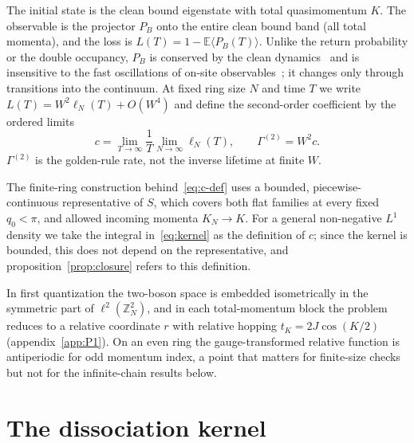 \documentclass[12pt,a4paper]{article}
\theoremstyle{remark}
\newcommand{\E}{\mathbb{E}}
\begin{document}
The initial state is the clean bound eigenstate with total quasimomentum $K$. The observable is the projector $P_B$ onto the entire clean bound band (all total momenta), and the loss is $L(T)=1-\E\langle P_B(T)\rangle$. Unlike the return probability or the double occupancy, $P_B$ is conserved by the clean dynamics~\cite{Boschi2014} and is insensitive to the fast oscillations of on-site observables~\cite{Bello2017}; it changes only through transitions into the continuum. At fixed ring size $N$ and time $T$ we write $L(T)=W^2\ell_N(T)+O(W^4)$ and define the second-order coefficient by the ordered limits
\begin{equation}\label{eq:c-def}
c=\lim_{T\to\infty}\frac{1}{T}\lim_{N\to\infty}\ell_N(T),\qquad \Gamma^{(2)}=W^2c .
\end{equation}
$\Gamma^{(2)}$ is the golden-rule rate, not the inverse lifetime at finite $W$.

The finite-ring construction behind~\eqref{eq:c-def} uses a bounded, piecewise-continuous representative of $S$, which covers both flat families at every fixed $q_0<\pi$, and allowed incoming momenta $K_N\to K$. For a general non-negative $L^1$ density we take the integral in~\eqref{eq:kernel} as the definition of $c$; since the kernel is bounded, this does not depend on the representative, and proposition~\ref{prop:closure} refers to this definition.

In first quantization the two-boson space is embedded isometrically in the symmetric part of $\ell^2(\mathbb{Z}_N^2)$, and in each total-momentum block the problem reduces to a relative coordinate $r$ with relative hopping $t_K=2J\cos(K/2)$ (appendix~\ref{app:P1}). On an even ring the gauge-transformed relative function is antiperiodic for odd momentum index, a point that matters for finite-size checks but not for the infinite-chain results below.

\section{The dissociation kernel}\label{sec:kernel}
\end{document}
